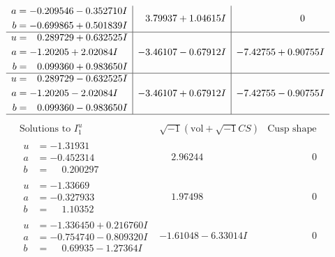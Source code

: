 \documentclass[1p]{elsarticle_modified}
\theoremstyle{definition}
\newcommand{\I}{\sqrt{-1}}
\begin{document}
$$\begin{array}{c|c|c}
\begin{aligned}
a &= -0.209546 - 0.352710 I \\
b &= -0.699865 + 0.501839 I\end{aligned}
 & \phantom{-}3.79937 + 1.04615 I & \phantom{-0.000000 } 0 \\ \hline\begin{aligned}
u &= \phantom{-}0.289729 + 0.632525 I \\
a &= -1.20205 + 2.02084 I \\
b &= \phantom{-}0.099360 + 0.983650 I\end{aligned}
 & -3.46107 - 0.67912 I & -7.42755 + 0.90755 I \\ \hline\begin{aligned}
u &= \phantom{-}0.289729 - 0.632525 I \\
a &= -1.20205 - 2.02084 I \\
b &= \phantom{-}0.099360 - 0.983650 I\end{aligned}
 & -3.46107 + 0.67912 I & -7.42755 - 0.90755 I\\
 \hline 
 \end{array}$$\newpage$$\begin{array}{c|c|c}  
\text{Solutions to }I^u_{1}& \I (\text{vol} + \sqrt{-1}CS) & \text{Cusp shape}\\
 \hline 
\begin{aligned}
u &= -1.31931\phantom{ +0.000000I} \\
a &= -0.452314\phantom{ +0.000000I} \\
b &= \phantom{-}0.200297\phantom{ +0.000000I}\end{aligned}
 & \phantom{-}2.96244\phantom{ +0.000000I} & \phantom{-0.000000 } 0 \\ \hline\begin{aligned}
u &= -1.33669\phantom{ +0.000000I} \\
a &= -0.327933\phantom{ +0.000000I} \\
b &= \phantom{-}1.10352\phantom{ +0.000000I}\end{aligned}
 & \phantom{-}1.97498\phantom{ +0.000000I} & \phantom{-0.000000 } 0 \\ \hline\begin{aligned}
u &= -1.336450 + 0.216760 I \\
a &= -0.754740 - 0.809320 I \\
b &= \phantom{-}0.69935 - 1.27364 I\end{aligned}
 & -1.61048 - 6.33014 I & \phantom{-0.000000 } 0 \\ \hline\begin{aligned}

\end{aligned}
\end{array}$$
\end{document}
